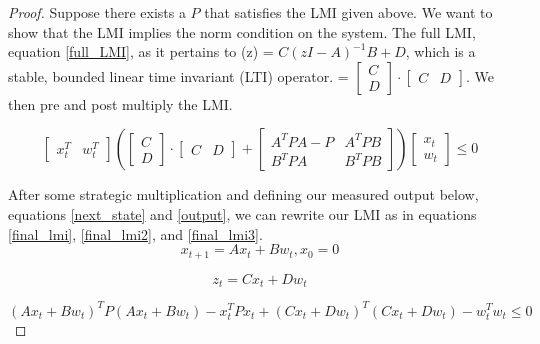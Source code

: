 \documentclass{article}[12pt]
\begin{document}
\begin{proof}
Suppose there exists a $P$ that satisfies the LMI given above. We want to show that the LMI implies the norm condition on the system. The full LMI, equation \ref{full_LMI}, as it pertains to (z) = $C(zI-A)^{-1} B+D$, which is a stable, bounded linear time invariant (LTI) operator.  = $\begin{bmatrix}
        C \\
        D
    \end{bmatrix} \cdot 
    \begin{bmatrix}
        C & D
    \end{bmatrix}$.
We then pre and post multiply the LMI. 
    
    \begin{equation}
        \label{full_LMI}
        \begin{bmatrix}
        x_t^T & w_t^T
        \end{bmatrix}
        \left( \begin{bmatrix}
        C \\
        D
    \end{bmatrix} \cdot \begin{bmatrix}
        C & D
    \end{bmatrix} +
        \begin{bmatrix}
        A^{T}PA - P & A^T PB \\
         B^{T}PA & B^T PB
    \end{bmatrix} \right) 
    \begin{bmatrix}
        x_t \\
        w_t
        \end{bmatrix} \leq 0
    \end{equation}
    
\noindent After some strategic multiplication and defining our measured output below, equations \ref{next_state} and \ref{output},  we can rewrite our LMI as in equations \ref{final_lmi}, \ref{final_lmi2}, and \ref{final_lmi3}.
\begin{equation}
    \label{next_state}
    x_{t+1} = Ax_t+Bw_t , x_0 = 0
\end{equation}

\begin{equation}
    \label{output}
    z_{t} = Cx_t+Dw_t
\end{equation}


\begin{equation}
    \label{final_lmi}
    (Ax_t+Bw_t)^T P (Ax_t+Bw_t) - x_t^T P x_t + (Cx_t+Dw_t)^T(Cx_t+Dw_t) - w_t^T w_t \leq 0
\end{equation}


\end{proof}
\end{document}
